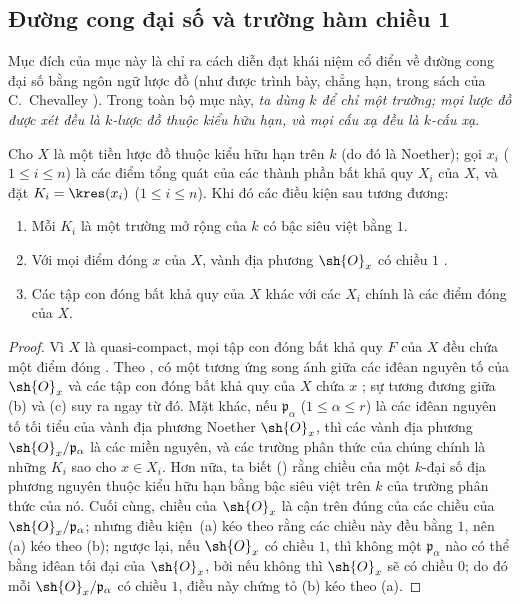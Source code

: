 \documentclass[oneside,10pt]{amsart}
\renewcommand{\leq}{\leqslant}
\newcommand{\oldpage}[2][]{\marginnote{\normalfont\footnotesize\textbf{#1}~|~#2}\ignorespaces}
\let\EGAOriginalLabel\label
\renewcommand{\label}[1]{\phantomsection\EGAOriginalLabel{#1}}
\begin{document}
\oldpage[II]{148}

\subsection{Đường cong đại số và trường hàm chiều 1}
\label{subsection:II.7.4}

Mục đích của mục này là chỉ ra cách diễn đạt khái niệm cổ điển về đường cong đại số bằng ngôn ngữ lược đồ (như được trình bày, chẳng hạn, trong sách của C.~Chevalley \cite{II-23}).
Trong toàn bộ mục này, \emph{ta dùng $k$ để chỉ một trường; mọi lược đồ được xét đều là $k$-lược đồ thuộc kiểu hữu hạn, và mọi cấu xạ đều là $k$-cấu xạ}.

\begin{proposition}[7.4.1]
\label{II.7.4.1}
Cho $X$ là một tiền lược đồ thuộc kiểu hữu hạn trên $k$ (do đó là Noether);
gọi $x_i$ ($1\leq i\leq n$) là các điểm tổng quát của các thành phần bất khả quy $X_i$ của $X$, và đặt $K_i=\kres(x_i)$ ($1\leq i\leq n$).
Khi đó các điều kiện sau tương đương:
\begin{enumerate}
    \item[\rm{(a)}] Mỗi $K_i$ là một trường mở rộng của $k$ có bậc siêu việt bằng $1$.
    \item[\rm{(b)}] Với mọi điểm đóng $x$ của $X$, vành địa phương $\sh{O}_x$ có chiều $1$ .
    \item[\rm{(c)}] Các tập con đóng bất khả quy của $X$ khác với các $X_i$ chính là các điểm đóng của $X$.
\end{enumerate}
\end{proposition}

\begin{proof}
Vì $X$ là quasi-compact, mọi tập con đóng bất khả quy $F$ của $X$ đều chứa một điểm đóng .
Theo , có một tương ứng song ánh giữa các iđêan nguyên tố của $\sh{O}_x$ và các tập con đóng bất khả quy của $X$ chứa $x$ ;
sự tương đương giữa (b) và (c) suy ra ngay từ đó.
Mặt khác, nếu $\mathfrak{p}_\alpha$ ($1\leq\alpha\leq r$) là các iđêan nguyên tố tối tiểu của vành địa phương Noether $\sh{O}_x$, thì các vành địa phương $\sh{O}_x/\mathfrak{p}_\alpha$ là các miền nguyên, và các trường phân thức của chúng chính là những $K_i$ sao cho $x\in X_i$.
Hơn nữa, ta biết (\cite[p.~4-06, th.~2]{I-1}) rằng chiều của một $k$-đại số địa phương nguyên thuộc kiểu hữu hạn bằng bậc siêu việt trên $k$ của trường phân thức của nó.
Cuối cùng, chiều của $\sh{O}_x$ là cận trên đúng của các chiều của $\sh{O}_x/\mathfrak{p}_\alpha$;
nhưng điều kiện~(a) kéo theo rằng các chiều này đều bằng $1$, nên (a) kéo theo (b);
ngược lại, nếu $\sh{O}_x$ có chiều $1$, thì không một $\mathfrak{p}_\alpha$ nào có thể bằng iđêan tối đại của $\sh{O}_x$, bởi nếu không thì $\sh{O}_x$ sẽ có chiều $0$;
do đó mỗi $\sh{O}_x/\mathfrak{p}_\alpha$ có chiều $1$, điều này chứng tỏ (b) kéo theo (a).
\end{proof}
\end{document}
